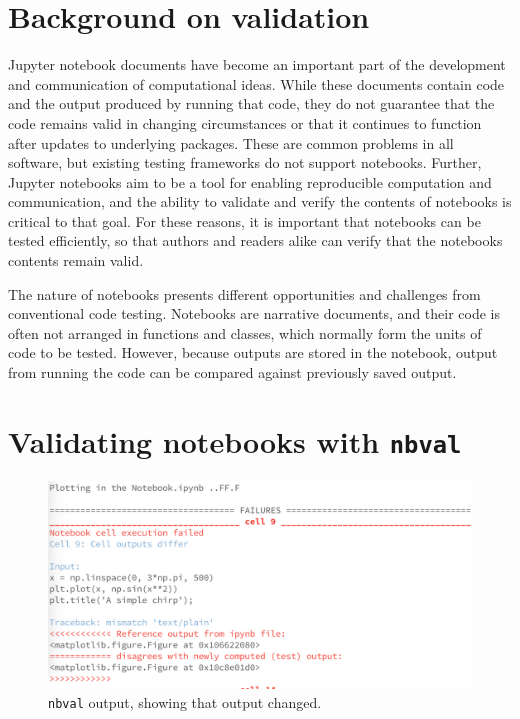 \documentclass{deliverablereport}
\author{Martin Sandve Aln\ae{}s \& Hans Fangohr \& Vidar Fauske \& Thomas Kluyver \& Benjamin Ragan-Kelley \& MORE?}
\begin{document}
\maketitle
%
\strut\githubissuedescription
\newpage\tableofcontents\newpage

\newcommand{\nbval}{\texttt{nbval} }

\section{Background on validation} %

Jupyter notebook documents have become an important part of the development and communication of computational ideas.
While these documents contain code and the output produced by running that code,
they do not guarantee that the code remains valid in changing circumstances or that it continues to function after updates to underlying packages.
These are common problems in all software, but existing testing frameworks do not support notebooks.
Further, Jupyter notebooks aim to be a tool for enabling reproducible computation and communication,
and the ability to validate and verify the contents of notebooks is critical to that goal.
For these reasons, it is important that notebooks can be tested efficiently,
so that authors and readers alike can verify that the notebooks contents remain valid.

The nature of notebooks presents different opportunities and challenges from conventional code testing.
Notebooks are narrative documents, and their code is often not arranged in functions and classes, which normally form the units of code to be tested.
However, because outputs are stored in the notebook,
output from running the code can be compared against previously saved output.

\section{Validating notebooks with \nbval} %

\begin{figure}[ht]
  \centering
  \includegraphics[width=.7\textwidth]{img/nbval-terminal}
  \caption{\nbval output, showing that output changed.}\label{fig:nbval}
\end{figure}
\end{document}
